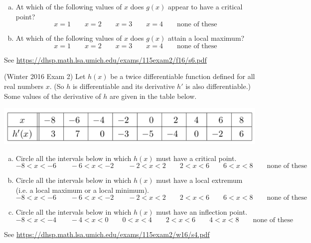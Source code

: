 \documentclass[11pt]{exam}
\begin{document}
\begin{questions}
\begin{center}
        \end{center}
\begin{enumerate}[(a)]
	\item At which of the following values of $x$ does $g(x)$ appear to have a critical point?		
	$$x=1 \qquad x=2 \qquad x=3 \qquad x=4 \qquad \textrm{none of these}$$
	\item At which of the following values of $x$ does $g(x)$ attain a local maximum?
	$$x=1 \qquad x=2 \qquad x=3 \qquad x=4 \qquad \textrm{none of these}$$
	\end{enumerate}
        \begin{solution}
          See \href{https://dhsp.math.lsa.umich.edu/exams/115exam2/f16/s6.pdf}{https://dhsp.math.lsa.umich.edu/exams/115exam2/f16/s6.pdf}
        \end{solution}
\question (Winter 2016 Exam 2) %
	Let $h(x)$ be a twice differentiable function defined for all real numbers $x$. (So $h$ is differentiable and its derivative $h'$ is also differentiable.)
Some values of the derivative of $h$ are given in the table below.
\begin{center}
  \includegraphics[scale=0.5]{Winter2016Exam2Problem4}
\end{center}
\begin{enumerate}[(a)]
\item Circle all the intervals below in which $h(x)$ must have a critical point.
$$-8 < x < -6  \qquad -6 < x < -2 \qquad -2 < x < 2 \qquad 2 < x < 6 \qquad 6 < x < 8 \qquad \textrm{none of these}$$
\item Circle all the intervals below in which $h(x)$ must have a local extremum (i.e. a local maximum or a local minimum).
$$-8 < x < -6  \qquad -6 < x < -2 \qquad -2< x < 2 \qquad 2 < x < 6 \qquad 6< x < 8 \qquad \textrm{none of these}$$
\item Circle all the intervals below in which $h(x)$ must have an inflection point.
$$-8 < x < -4  \qquad -4 < x < 0 \qquad 0 < x < 4 \qquad 2 < x < 6 \qquad 4 < x < 8 \qquad \textrm{none of these}$$
\end{enumerate}
\begin{solution}
  See \href{https://dhsp.math.lsa.umich.edu/exams/115exam2/w16/s4.pdf}{https://dhsp.math.lsa.umich.edu/exams/115exam2/w16/s4.pdf}
\end{solution}
\end{questions}
\end{document}
